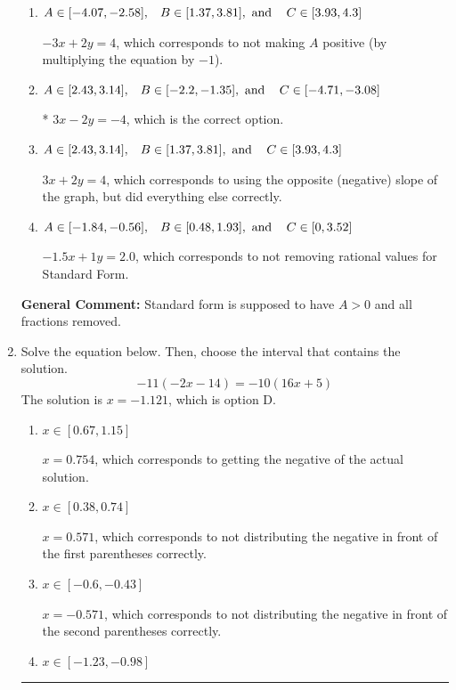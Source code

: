 \documentclass{extbook}[14pt]
\newcommand{\litem}[1]{\item #1

\rule{\textwidth}{0.4pt}}
\begin{document}
\begin{enumerate}
{\begin{enumerate}[label=\Alph*.]
 $-1.5x - 1y = -2.0$, which corresponds to using the opposite (negative) slope of the graph and not removing rational values.
\item \( A \in [-4.07, -2.58], \hspace{3mm} B \in [1.37, 3.81], \text{ and } \hspace{3mm} C \in [3.93, 4.3] \)

 $-3x + 2y = 4$, which corresponds to not making $A$ positive (by multiplying the equation by $-1$).
\item \( A \in [2.43, 3.14], \hspace{3mm} B \in [-2.2, -1.35], \text{ and } \hspace{3mm} C \in [-4.71, -3.08] \)

* $3x - 2y = -4$, which is the correct option.
\item \( A \in [2.43, 3.14], \hspace{3mm} B \in [1.37, 3.81], \text{ and } \hspace{3mm} C \in [3.93, 4.3] \)

 $3x + 2y = 4$, which corresponds to using the opposite (negative) slope of the graph, but did everything else correctly.
\item \( A \in [-1.84, -0.56], \hspace{3mm} B \in [0.48, 1.93], \text{ and } \hspace{3mm} C \in [0, 3.52] \)

 $-1.5x + 1y = 2.0$, which corresponds to not removing rational values for Standard Form.
\end{enumerate}

\textbf{General Comment:} Standard form is supposed to have $A > 0$ and all fractions removed.
}
\litem{
Solve the equation below. Then, choose the interval that contains the solution.
\[ -11(-2x -14) = -10(16x + 5) \]
The solution is \( x = -1.121 \), which is option D.\begin{enumerate}[label=\Alph*.]
\item \( x \in [0.67, 1.15] \)

$x = 0.754$, which corresponds to getting the negative of the actual solution.
\item \( x \in [0.38, 0.74] \)

$x = 0.571$, which corresponds to not distributing the negative in front of the first parentheses correctly.
\item \( x \in [-0.6, -0.43] \)

$x = -0.571$, which corresponds to not distributing the negative in front of the second parentheses correctly.
\item \( x \in [-1.23, -0.98] \)


\end{enumerate}}
\end{enumerate}
\end{document}
